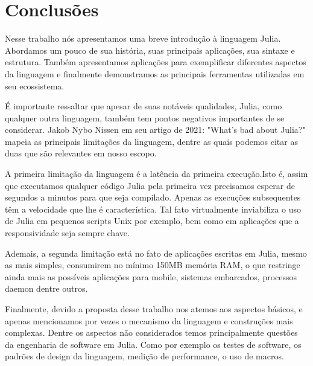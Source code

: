 %



\chapter{Conclus\~{o}es}

Nesse trabalho nós apresentamos uma breve introdução à linguagem Julia. Abordamos um pouco de sua história, suas principais aplicações, sua sintaxe e estrutura. Também apresentamos aplicações para exemplificar diferentes aspectos da linguagem e finalmente demonstramos as principais ferramentas utilizadas em seu ecossistema. 

É importante ressaltar que apesar de suas notáveis qualidades, Julia, como qualquer outra linguagem, também tem pontos negativos importantes de se considerar. Jakob Nybo Nissen em seu artigo de 2021: "What's bad about Julia?"\cite{Nissen2021} mapeia as principais limitações da linguagem, dentre as quais podemos citar as duas que são relevantes em nosso escopo.

A primeira limitação da linguagem é a latência da primeira execução.Isto é, assim que executamos qualquer código Julia pela primeira vez precisamos esperar de segundos a minutos para que seja compilado. Apenas as execuções subsequentes têm a velocidade que lhe é característica. Tal fato virtualmente inviabiliza o uso de Julia em pequenos scripts Unix por exemplo, bem como em aplicações que a responsividade seja sempre chave.

Ademais, a segunda limitação está no fato de aplicações escritas em Julia, mesmo as mais simples, consumirem no mínimo 150MB memória RAM, o que restringe ainda mais as possíveis aplicações para mobile, sistemas embarcados, processos daemon dentre outros.  

Finalmente, devido a proposta desse trabalho nos atemos aos aspectos básicos, e apenas mencionamos por vezes o mecanismo da linguagem e construções mais complexas. 
Dentre os aspectos não considerados temos principalmente questões da engenharia de software em Julia. Como por exemplo os testes de software, os padrões de design da linguagem, medição de performance, o uso de macros. 

